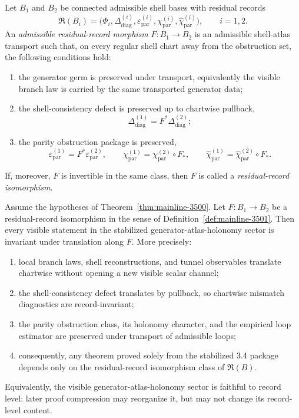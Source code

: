 \begin{definition}
\label{def:mainline-3501}
Let $B_1$ and $B_2$ be connected admissible shell bases with residual records
\[
  \mathfrak R(B_i)=\bigl(\Phi_i,\Delta^{(i)}_{\mathrm{diag}},\varepsilon^{(i)}_{\mathrm{par}},\chi^{(i)}_{\mathrm{par}},\widehat\chi^{(i)}_{\mathrm{par}}\bigr),
  \qquad i=1,2.
\]
An \emph{admissible residual-record morphism} $F:B_1\to B_2$ is an admissible shell-atlas transport such that, on every regular shell chart away from the obstruction set, the following conditions hold:
\begin{enumerate}[label=(\roman*), leftmargin=2em]
  \item the generator germ is preserved under transport, equivalently the visible branch law is carried by the same transported generator data;
  \item the shell-consistency defect is preserved up to chartwise pullback,
  \[
    \Delta^{(1)}_{\mathrm{diag}} = F^*\Delta^{(2)}_{\mathrm{diag}};
  \]
  \item the parity obstruction package is preserved,
  \[
    \varepsilon^{(1)}_{\mathrm{par}} = F^*\varepsilon^{(2)}_{\mathrm{par}},
    \qquad
    \chi^{(1)}_{\mathrm{par}} = \chi^{(2)}_{\mathrm{par}}\circ F_*,
    \qquad
    \widehat\chi^{(1)}_{\mathrm{par}} = \widehat\chi^{(2)}_{\mathrm{par}}\circ F_*.
  \]
\end{enumerate}
If, moreover, $F$ is invertible in the same class, then $F$ is called a \emph{residual-record isomorphism}.
\end{definition}

\begin{theorem}
\label{thm:mainline-3501}
Assume the hypotheses of Theorem~\ref{thm:mainline-3500}. Let $F:B_1\to B_2$ be a residual-record isomorphism in the sense of Definition~\ref{def:mainline-3501}. Then every visible statement in the stabilized generator-atlas-holonomy sector is invariant under translation along $F$. More precisely:
\begin{enumerate}[label=(\roman*), leftmargin=2em]
  \item local branch laws, shell reconstructions, and tunnel observables translate chartwise without opening a new visible scalar channel;
  \item the shell-consistency defect translates by pullback, so chartwise mismatch diagnostics are record-invariant;
  \item the parity obstruction class, its holonomy character, and the empirical loop estimator are preserved under transport of admissible loops;
  \item consequently, any theorem proved solely from the stabilized 3.4 package depends only on the residual-record isomorphism class of $\mathfrak R(B)$.
\end{enumerate}
Equivalently, the visible generator-atlas-holonomy sector is faithful to record level: later proof compression may reorganize it, but may not change its record-level content.
\end{theorem}


